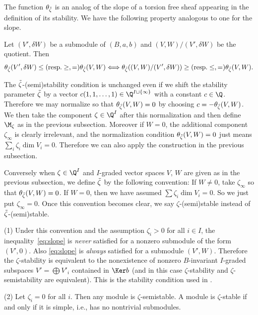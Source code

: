 The function $\theta_{\Tilde\zeta}$ is an analog of the slope of a
torsion free sheaf appearing in the def\/inition of its stability. We
have the following property analogous to one for the slope.
\begin{Lemma}\label{lem:slope}
  Let $(V',\delta W)$ be a submodule of $(B,a,b)$ and
  $(V,W)/(V',\delta W)$ be the quotient. Then
  \begin{equation*}
     \theta_{\Tilde\zeta}(V',\delta W)
     \le (\text{resp.} \ge, =)
     \theta_{\Tilde\zeta}(V,W)
     \Longleftrightarrow
     \theta_{\Tilde\zeta}((V,W)/(V',\delta W))
     \ge (\text{resp.} \le, =)
     \theta_{\Tilde\zeta}(V,W).
  \end{equation*}
\end{Lemma}


The $\Tilde\zeta$-(semi)stability condition is unchanged even if we
shift the stability parameter $\Tilde\zeta$ by a vector
$c(1,1,\dots,1)\in \Q^{I\sqcup\{\infty\}}$ with a constant $c\in \Q$.
Therefore we may normalize so that $\theta_{\Tilde\zeta}(V,W) = 0$
by choosing $c = -\theta_{\Tilde\zeta}(V,W)$.
We then take the component $\zeta\in\Q^I$ after this normalization and
then def\/ine $\M_\zeta$ as in the previous subsection.
Moreover if $W=0$, the additional component $\zeta_\infty$ is clearly
irrelevant, and the normalization condition
$\theta_{\Tilde\zeta}(V,W) = 0$ just means $\sum_i \zeta_i \dim V_i
= 0$. Therefore we can also apply the construction in the previous
subsection.

Conversely when $\zeta\in\Q^I$ and $I$-graded vector spaces $V$, $W$
are given as in the previous subsection, we def\/ine $\Tilde\zeta$ by
the following convention: If $W \neq 0$, take $\zeta_\infty$ so that
$\theta_{\Tilde\zeta}(V,W) = 0$. If $W = 0$, then we have assumed
$\sum \zeta_i \dim V_i = 0$. So we just put $\zeta_\infty = 0$.
%
Once this convention becomes clear, we say
$\zeta$-(semi)stable instead of $\Tilde\zeta$-(semi)stable.

\begin{Example}\label{ex:stndcham}
(1)
Under this convention and the assumption $\zeta_{i} > 0$ for all $i\in I$,
the inequali\-ty~\eqref{eq:slope} is {\it never\/} satisf\/ied for a
nonzero submodule of the form $(V',0)$. Also
\eqref{eq:slope} is {\it always} satisf\/ied for a submodule
$(V',W)$.
Therefore the $\zeta$-stability is equivalent to the nonexistence of
nonzero $B$-invariant $I$-graded subspaces $V' = \bigoplus V'_i$
contained in $\Ker b$
(and in this case $\zeta$-stability and $\zeta$-semistability
are equivalent). This is the stability condition used in
\cite[{3.9}]{Na-alg}.

(2) Let $\zeta_i = 0$ for all $i$. Then any module is
$\zeta$-semistable. A module is $\zeta$-stable if and only if it is
simple, i.e., has no nontrivial submodules.
\end{Example}

